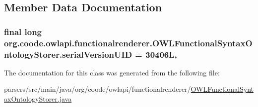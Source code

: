 \subsection{Member Data Documentation}
\hypertarget{classorg_1_1coode_1_1owlapi_1_1functionalrenderer_1_1_o_w_l_functional_syntax_ontology_storer_a8645b6009eb520ca88cb27792b46ec33}{
\subsubsection[{serial\-Version\-U\-I\-D}]{\setlength{\rightskip}{0pt plus 5cm}final long org.\-coode.\-owlapi.\-functionalrenderer.\-O\-W\-L\-Functional\-Syntax\-Ontology\-Storer.\-serial\-Version\-U\-I\-D = 30406\-L\hspace{0.3cm}{\ttfamily [static]}, {\ttfamily [private]}}}\label{classorg_1_1coode_1_1owlapi_1_1functionalrenderer_1_1_o_w_l_functional_syntax_ontology_storer_a8645b6009eb520ca88cb27792b46ec33}


The documentation for this class was generated from the following file\-:\begin{DoxyCompactItemize}
\item 
parsers/src/main/java/org/coode/owlapi/functionalrenderer/\hyperlink{_o_w_l_functional_syntax_ontology_storer_8java}{O\-W\-L\-Functional\-Syntax\-Ontology\-Storer.\-java}\end{DoxyCompactItemize}
